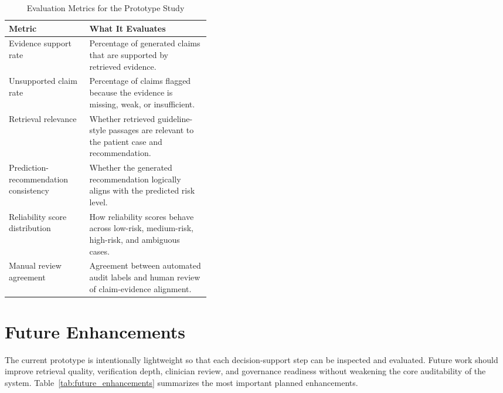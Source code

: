 \documentclass[conference]{IEEEtran}
\begin{document}
\begin{table}[!htbp]
\caption{Evaluation Metrics for the Prototype Study}
\label{tab:evaluation_plan}
\centering
\scriptsize
\begin{tabularx}{\linewidth}{L{0.40\linewidth}Y}
\toprule
\textbf{Metric} & \textbf{What It Evaluates} \\
\midrule
Evidence support rate & Percentage of generated claims that are supported by retrieved evidence. \\
Unsupported claim rate & Percentage of claims flagged because the evidence is missing, weak, or insufficient. \\
Retrieval relevance & Whether retrieved guideline-style passages are relevant to the patient case and recommendation. \\
Prediction-recommendation consistency & Whether the generated recommendation logically aligns with the predicted risk level. \\
Reliability score distribution & How reliability scores behave across low-risk, medium-risk, high-risk, and ambiguous cases. \\
Manual review agreement & Agreement between automated audit labels and human review of claim-evidence alignment. \\
\bottomrule
\end{tabularx}
\end{table}


\section{Future Enhancements}
The current prototype is intentionally lightweight so that each decision-support step can be inspected and evaluated. Future work should improve retrieval quality, verification depth, clinician review, and governance readiness without weakening the core auditability of the system. Table~\ref{tab:future_enhancements} summarizes the most important planned enhancements.
\end{document}
